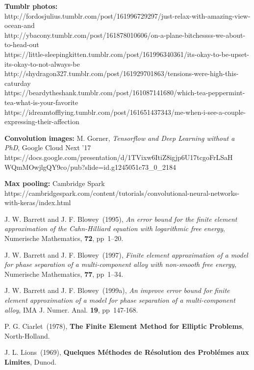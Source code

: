 \begin{thebibliography}{999}

{\bf Tumblr photos:}\\
http://fordosjulius.tumblr.com/post/161996729297/just-relax-with-amazing-view-ocean-and\\
http://ybacony.tumblr.com/post/161878010606/on-a-plane-bitchessss-we-about-to-head-out\\
https://little-sleepingkitten.tumblr.com/post/161996340361/its-okay-to-be-upset-its-okay-to-not-always-be\\
http://shydragon327.tumblr.com/post/161929701863/tensions-were-high-this-caturday\\
https://beardytheshank.tumblr.com/post/161087141680/which-tea-peppermint-tea-what-is-your-favorite\\
https://idreamtofflying.tumblr.com/post/161651437343/me-when-i-see-a-couple-expressing-their-affection

{\bf Convolution images:} M. Gorner, {\it Tensorflow and Deep Learning without a PhD}, Google Cloud Next '17\\ 
https://docs.google.com/presentation/d/1TVixw6ItiZ8igjp6U17tcgoFrLSaH\\WQmMOwjlgQY9co/pub?slide=id.g1245051c73\_0\_2184

{\bf Max pooling:} Cambridge Spark\\
https://cambridgespark.com/content/tutorials/convolutional-neural-networks-with-keras/index.html

J. W. Barrett and J. F. Blowey~(1995),  
{\it An error bound for the finite element approximation of the Cahn-Hilliard equation with logarithmic free energy}, 
Numerische Mathematics, 
{\bf 72}, pp~1--20.

J. W. Barrett and J. F. Blowey~(1997),  
{\it Finite element approximation of a model for phase separation of a multi-component alloy with non-smooth free energy}, 
Numerische Mathematics, 
{\bf 77}, pp~1--34.

J. W. Barrett and J. F. Blowey~(1999a),  
{\it An improve error bound for finite element approximation of a
model for phase separation of a multi-component alloy}, 
IMA J. Numer. Anal.  
{\bf 19}, pp~147-168.

P. G. Ciarlet~(1978),
{\bf The Finite Element Method for Elliptic Problems}, 
North-Holland. 

J. L. Lions~(1969),
{\bf Quelques M\'ethodes de R\'esolution
des Probl\'emes aux Limites}, 
Dunod.

\end{thebibliography}




